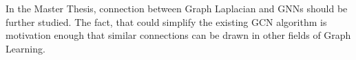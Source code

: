 \begin{tcolorbox}[colback=red!5!white,colframe=red!75!black]
    In the Master Thesis, connection between Graph Laplacian and GNNs should be further studied.
    The fact, that \citet{simpleGCN} could simplify the existing GCN algorithm is motivation enough
    that similar connections can be drawn in other fields of Graph Learning.
\end{tcolorbox}

